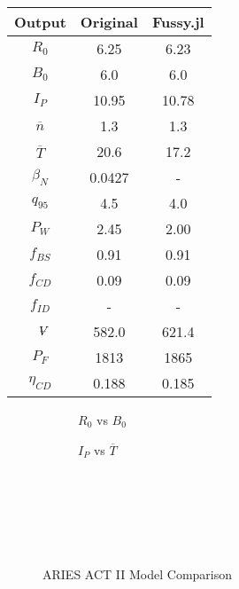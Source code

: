 \begin{table}[b!]
\begin{subtable}[t]{0.5\textwidth}
\begin{tabular}{ c|c|c }
Output           & Original         & Fussy.jl        \\
\hline
$R_{0}$          & 6.25             & 6.23           \\
$B_{0}$          & 6.0              & 6.0           \\
$I_{P}$          & 10.95            & 10.78           \\
$\overline n$    & 1.3              & 1.3           \\
$\overline T$    & 20.6             & 17.2            \\
$\beta_{N}$       & 0.0427           & -          \\
$q_{95}$         & 4.5              & 4.0           \\
$P_{W}$          & 2.45             & 2.00           \\
$f_{BS}$         & 0.91             & 0.91           \\
$f_{CD}$         & 0.09             & 0.09           \\
$f_{ID}$         & -              & -             \\
$\volume$         & 582.0            & 621.4           \\
$P_{F}$          & 1813           & 1865          \\
$\eta_{CD}$      & 0.188            & 0.185          \\

\end{tabular}
\end{subtable}
\hfill
\hfill
\label{table:act_1}
\end{table}

\begin{figure*}[t!]
    \centering
    \hfill
    \begin{subfigure}[t]{0.45\textwidth}
        \centering
    \begin{adjustbox}{width=\textwidth}
      \Large
      
    \end{adjustbox}
        \caption{$R_0$ vs $B_0$}
    \end{subfigure}
    \hfill
    \begin{subfigure}[t]{0.45\textwidth}
        \centering
    \begin{adjustbox}{width=\textwidth}
      \Large
      
    \end{adjustbox}
        \caption{$I_P$ vs $\overline T$}
    \end{subfigure}
    \hfill \hfill ~\\ ~\\ ~\\
    \caption{ARIES ACT II Model Comparison} ~\\
    \label{fig:act_2_comparison}
\end{figure*}


